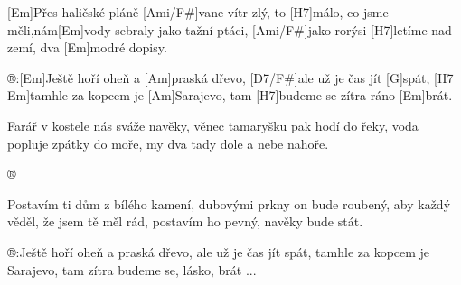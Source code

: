 
[Em]Přes haličské pláně [Ami/F#]vane vítr zlý,
to [H7]málo, co jsme měli,nám[Em]vody sebraly
jako tažní ptáci, [Ami/F#]jako rorýsi
[H7]letíme nad zemí, dva [Em]modré dopisy.

®:[Em]Ještě hoří oheň a [Am]praská dřevo,
[D7/F#]ale už je čas jít [G]spát, [H7
Em]tamhle za kopcem je [Am]Sarajevo,
tam [H7]budeme se zítra ráno [Em]brát.

Farář v kostele nás sváže navěky,
věnec tamaryšku pak hodí do řeky,
voda popluje zpátky do moře,
my dva tady dole a nebe nahoře. 

®

Postavím ti dům z bílého kamení,
dubovými prkny on bude roubený,
aby každý věděl, že jsem tě měl rád,
postavím ho pevný, navěky bude stát.

®:Ještě hoří oheň a praská dřevo,
ale už je čas jít spát,
tamhle za kopcem je Sarajevo,
tam zítra budeme se, lásko, brát ...


